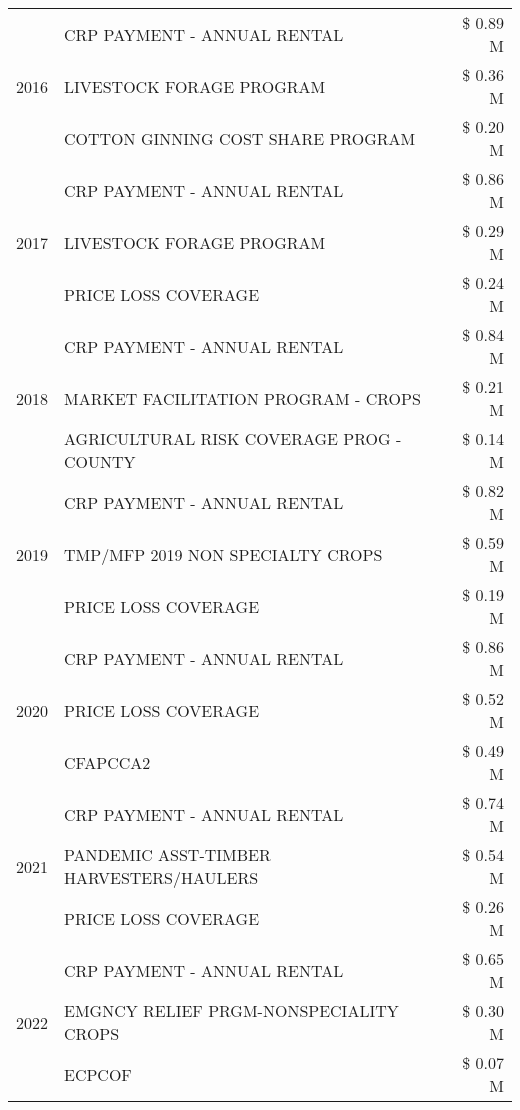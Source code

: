 \begin{tabular}{llr}
\cline{1-3}
\multirow[t]{3}{*}{2016} & CRP PAYMENT - ANNUAL RENTAL & \$ 0.89 M \\
 & LIVESTOCK FORAGE PROGRAM & \$ 0.36 M \\
 & COTTON GINNING COST SHARE PROGRAM & \$ 0.20 M \\
\cline{1-3}
\multirow[t]{3}{*}{2017} & CRP PAYMENT - ANNUAL RENTAL & \$ 0.86 M \\
 & LIVESTOCK FORAGE PROGRAM & \$ 0.29 M \\
 & PRICE LOSS COVERAGE & \$ 0.24 M \\
\cline{1-3}
\multirow[t]{3}{*}{2018} & CRP PAYMENT - ANNUAL RENTAL & \$ 0.84 M \\
 & MARKET FACILITATION PROGRAM - CROPS & \$ 0.21 M \\
 & AGRICULTURAL RISK COVERAGE PROG - COUNTY & \$ 0.14 M \\
\cline{1-3}
\multirow[t]{3}{*}{2019} & CRP PAYMENT - ANNUAL RENTAL & \$ 0.82 M \\
 & TMP/MFP 2019 NON SPECIALTY CROPS & \$ 0.59 M \\
 & PRICE LOSS COVERAGE & \$ 0.19 M \\
\cline{1-3}
\multirow[t]{3}{*}{2020} & CRP PAYMENT - ANNUAL RENTAL & \$ 0.86 M \\
 & PRICE LOSS COVERAGE & \$ 0.52 M \\
 & CFAPCCA2 & \$ 0.49 M \\
\cline{1-3}
\multirow[t]{3}{*}{2021} & CRP PAYMENT - ANNUAL RENTAL & \$ 0.74 M \\
 & PANDEMIC ASST-TIMBER HARVESTERS/HAULERS & \$ 0.54 M \\
 & PRICE LOSS COVERAGE & \$ 0.26 M \\
\cline{1-3}
\multirow[t]{3}{*}{2022} & CRP PAYMENT - ANNUAL RENTAL & \$ 0.65 M \\
 & EMGNCY RELIEF PRGM-NONSPECIALITY CROPS & \$ 0.30 M \\
 & ECPCOF & \$ 0.07 M \\
\cline{1-3}
\bottomrule
\end{tabular}
